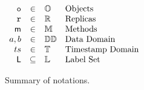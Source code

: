\begin{figure}[t]
  \centering

  \(
  \begin{array}[t]{rcll}
    \mathtt{o} & \in  & \mathbb{O} & \text{Objects} \\
    \mathtt{r} & \in & \mathbb{R} & \text{Replicas} \\
    \mathsf{m} & \in & \mathbb{M} & \text{Methods}\\
    a, b & \in & \mathbb{DD} & \text{Data Domain} \\
    ts & \in & \mathbb{T} & \text{Timestamp Domain} \\
    \mathsf{L} & \subseteq & \mathbb{L} & \text{Label Set}\\
  \end{array}
  \)
  \caption{Summary of notations.}
  \label{fig:notations}
\end{figure}


